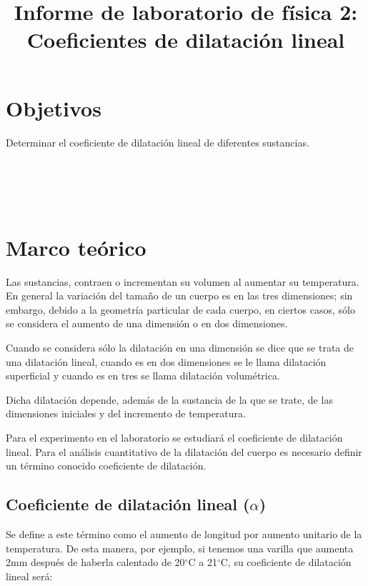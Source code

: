 \documentclass{article}
\title{Informe de laboratorio de física 2: Coeficientes de dilatación lineal}
\begin{document}



\tableofcontents
\newpage
\section{Objetivos}
    Determinar el coeficiente de dilatación lineal de diferentes sustancias.
    
 

\section{\\\\Marco teórico}
Las sustancias, contraen o incrementan su volumen al aumentar su temperatura.
En general la variación del tamaño de un cuerpo es en las tres dimensiones; sin embargo, debido a la geometría particular de cada cuerpo, en ciertos casos, sólo se considera el aumento de una dimensión o en dos dimensiones.


Cuando se considera sólo la dilatación en una dimensión se dice que se trata de una dilatación lineal, cuando es en dos dimensiones se le llama dilatación superficial y cuando es en tres se llama dilatación volumétrica.


Dicha dilatación depende, además de la sustancia de la que se trate, de las dimensiones iniciales y del incremento de temperatura.


Para el experimento en el laboratorio se estudiará el coeficiente de dilatación lineal.
Para el análisis cuantitativo de la dilatación del cuerpo es necesario definir un término conocido coeficiente de dilatación.

\subsection{Coeficiente de dilatación lineal ($\alpha$)}

Se define a este término como el aumento de longitud por aumento unitario de la temperatura. De esta manera, por ejemplo, si tenemos una varilla que aumenta 2mm después de haberla calentado de 20$^{\circ}$C a 21$^{\circ}$C, su coeficiente de dilatación lineal será:
\end{document}
